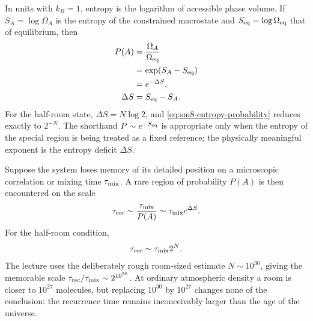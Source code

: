 In units with \(k_B=1\), entropy is the logarithm of accessible phase volume.
If \(S_A=\log\Omega_A\) is the entropy of the constrained macrostate and
\(S_{\rm eq}=\log\Omega_{\rm eq}\) that of equilibrium, then
\begin{equation}
 \begin{aligned}
 P(A)
 &=\frac{\Omega_A}{\Omega_{\rm eq}}\\
 &=\exp\!\left(S_A-S_{\rm eq}\right)\\
 &=e^{-\Delta S},\\
 \Delta S&=S_{\rm eq}-S_A.
 \end{aligned}
 \label{eq:sm8-entropy-probability}
\end{equation}
For the half-room state, \(\Delta S=N\log 2\), and
\eqref{eq:sm8-entropy-probability} reduces exactly to \(2^{-N}\).
The shorthand \(P\sim e^{-S_{\rm eq}}\) is appropriate only when the entropy
of the special region is being treated as a fixed reference; the physically
meaningful exponent is the entropy deficit \(\Delta S\).

\begin{classroomqa}
\end{classroomqa}

Suppose the system loses memory of its detailed position on a microscopic
correlation or mixing time \(\tau_{\rm mix}\).  A rare region of probability
\(P(A)\) is then encountered on the scale
\begin{equation}
 \tau_{\rm rec}
 \sim \frac{\tau_{\rm mix}}{P(A)}
 \sim \tau_{\rm mix}e^{\Delta S}.
 \label{eq:sm8-recurrence-time-general}
\end{equation}
For the half-room condition,
\begin{equation}
 \tau_{\rm rec}\sim\tau_{\rm mix}2^N.
 \label{eq:sm8-recurrence-time-half}
\end{equation}
The lecture uses the deliberately rough room-sized estimate
\(N\sim10^{30}\), giving the memorable scale
\(\tau_{\rm rec}/\tau_{\rm mix}\sim2^{10^{30}}\).  At ordinary atmospheric
density a room is closer to \(10^{27}\) molecules, but replacing
\(10^{30}\) by \(10^{27}\) changes none of the conclusion: the recurrence
time remains inconceivably larger than the age of the universe.

